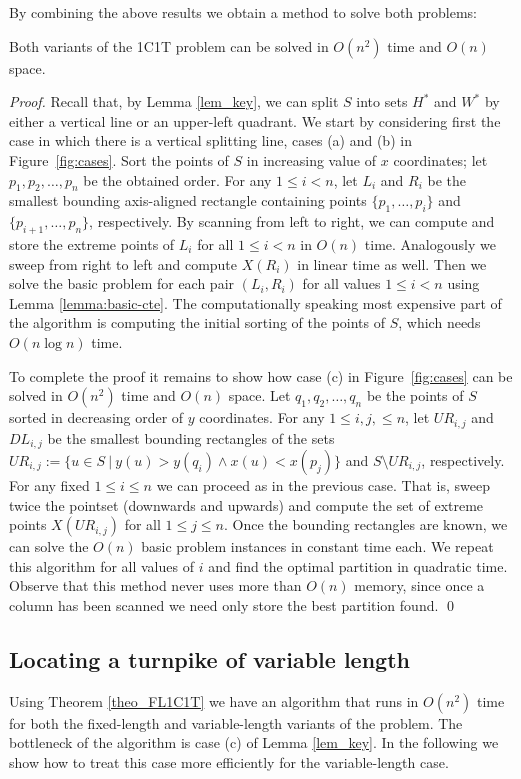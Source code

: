 \documentclass{llncs}
\newcommand{\x}[1]{x({#1})}
\newcommand{\y}[1]{y({#1})}
\begin{document}
By combining the above results we obtain a method to solve both problems:

\begin{theorem}\label{theo_FL1C1T}
Both variants of the 1C1T problem can be solved in $O(n^2)$ time and $O(n)$ space.
\end{theorem}
\begin{proof}
Recall that, by Lemma \ref{lem_key}, we can split $S$ into sets $H^*$ and $W^*$ by either a  vertical line or an upper-left quadrant. We start by considering first the case in which there is a vertical splitting line, cases (a) and (b) in Figure~\ref{fig:cases}. Sort the points of $S$ in increasing value of $x$ coordinates; let $p_1, p_2, \ldots , p_n$ be the obtained order. For any $1\leq i< n$, let $L_i$ and $R_i$ be the smallest bounding axis-aligned rectangle containing points $\{p_1,\dots,p_i\}$ and $\{p_{i+1},\dots,p_n\}$, respectively. By scanning from left to right, we can compute and store the extreme points of $L_i$ for all $1\leq i<n$ in $O(n)$ time. Analogously we sweep from right to left and compute $X(R_i)$ in linear time as well. Then we solve the basic problem for each pair $(L_i,R_i)$ for all values $1\leq i<n$ using Lemma \ref{lemma:basic-cte}. The computationally speaking most expensive part of the algorithm is computing the initial sorting of the points of $S$, which needs $O(n\log n)$ time.

To complete the proof it remains to show how case (c)  in Figure~\ref{fig:cases} can be solved in $O(n^2)$ time and $O(n)$ space.
Let $q_1, q_2, \ldots, q_n$ be the points of $S$ sorted in decreasing order of $y$ coordinates. For any $1 \leq i,j,\leq n$, let $UR_{i,j}$ and $DL_{i,j}$ be the smallest bounding rectangles of the sets $UR_{i,j}:=\{u\in S~|~\y{u}>\y{q_i}\wedge \x{u}<\x{p_j}\}$ and $S\setminus UR_{i,j}$, respectively. For any fixed $1\leq i \leq n$ we can proceed as in the previous case. That is, sweep twice the pointset (downwards and upwards) and compute the set of extreme points $X(UR_{i,j})$ for all $1\leq j\leq n$. Once the bounding rectangles are known, we can solve the $O(n)$ basic problem instances in constant time each. We repeat this algorithm for all values of $i$ and find the optimal partition in quadratic time. Observe that this method never uses more than $O(n)$ memory, since once a column has been scanned we need only store the best partition found. \qed
\end{proof}

\subsection{Locating a turnpike of variable length}
Using Theorem \ref{theo_FL1C1T} we have an algorithm that runs in $O(n^2)$ time for both the fixed-length and variable-length variants of the problem. The bottleneck of the algorithm is case (c) of Lemma \ref{lem_key}. In the following we show how to treat this case more efficiently for the variable-length case.
\end{document}
